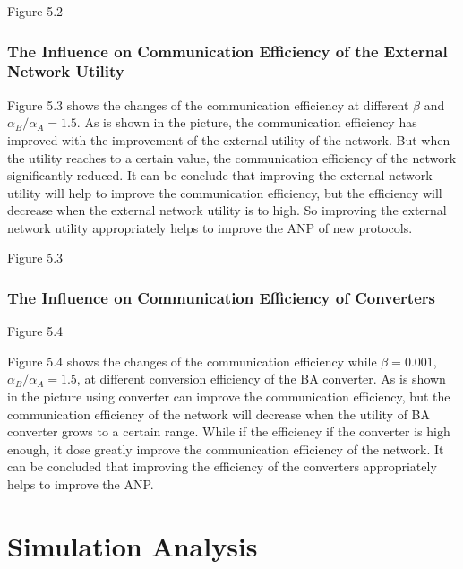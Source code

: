 \documentclass{article}
\begin{document}
Figure 5.2

\subsubsection{The Influence on Communication Efficiency of the External Network Utility}
Figure 5.3 shows the changes of the communication efficiency at different $\beta$ and $\alpha_{B}/\alpha_{A}=1.5$. As is
shown in the picture, the communication efficiency has improved with the improvement of the external utility of the network.
But when the utility reaches to a certain value, the communication efficiency of the network significantly reduced. It
can be conclude that improving the external network utility will help to improve the communication efficiency, but the
efficiency will decrease when the external network utility is to high. So improving the external network utility
appropriately helps to improve the ANP of new protocols.

Figure 5.3

\subsubsection{The Influence on Communication Efficiency of Converters}
Figure 5.4

Figure 5.4 shows the changes of the communication efficiency while $\beta= 0.001$, $\alpha_B/\alpha_A=1.5$, at different
conversion efficiency of the BA converter. As is shown in the picture using converter can improve the communication efficiency,
but the communication efficiency of the network will decrease when the utility of BA converter grows to a certain range.
While if the efficiency if the converter is high enough, it dose greatly improve the communication efficiency of the network.
It can be concluded that improving the efficiency of the converters appropriately helps to improve the ANP.

\section{Simulation Analysis}
\end{document}
